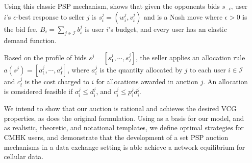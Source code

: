 \documentclass[12pt]{article}
\theoremstyle{definition}
\newcommand{\mcI}{\mathcal{I}}
\begin{document}
\begin{multicols}{2}
Using this classic PSP mechanism, \cite{lazar} shows that given the opponents
bids $s_{-i}$,
user $i$'s $\epsilon$-best response to seller $j$ is $s_i^j = (w_i^j, v_i^j)$
and is a Nash move
where $\epsilon > 0$ is the bid fee, $B_i =\sum_{j\in\mcI} b_i^j$ is user $i$'s
budget, and every user has an elastic demand function.

Based on the profile of bids $s^j = [s^j_1, \cdots , s^j_I]$, the seller applies
an allocation rule $a(s^j) = [a_1^j, \cdots , a_I^j]$, where $a^j_i$ is the quantity allocated
by $j$ to each user $i\in\mcI$ and $c^j_i$ is the cost charged to $i$ for
allocations awarded in auction $j$. 
An allocation is considered feasible if $a^j_i \le d_i^j$, and $c^j_i \le  p^j_i d_i^j$.

We intend to show that our auction
is rational and achieves the desired VCG properties, as does the original
formulation. Using \cite{zheng} as a basis for our model, and \cite{lazar} as
realistic, theoretic, and notational templates, we define optimal strategies for
CMHK users, and demonstrate that the development of a set PSP auction mechanisms
in a data exchange setting is able achieve a network equilibrium for cellular data. 


\end{multicols}
\end{document}
